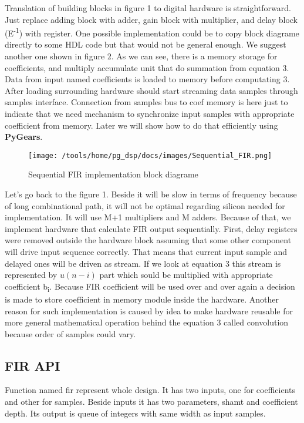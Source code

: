 \documentclass[a4paper, 12pt]{article}
\begin{document}
Translation of building blocks in figure 1 to digital hardware is straightforward. Just replace adding block with adder, gain block with multiplier, and delay block (E\textsuperscript{-1}) with register. One possible implementation could be to copy block diagrame directly to some HDL code but that would not be general enough. We suggest another one shown in figure 2. As we can see, there is a memory storage for coefficients, and multiply accumulate unit that do summation from equation 3. Data from input named coefficients is loaded to memory before computating 3. After loading surrounding hardware should start streaming data samples through samples interface. Connection from samples bus to coef memory is here just to indicate that we need mechanism to synchronize input samples with appropriate coefficient from memory. Later we will show how to do that efficiently using \textbf{PyGears}.

\begin{figure}[h]
\texttt{[image: /tools/home/pg\_dsp/docs/images/Sequential\_FIR.png]}
\caption{Sequential FIR implementation block diagrame}
\label{fig:Sequential FIR calculation}
\end{figure}


Let's go back to the figure 1. Beside it will be slow in terms of frequency because of long combinational path, it will not be optimal regarding silicon needed for implementation. It will use M+1 multipliers and M adders. Because of that, we implement hardware that calculate FIR output sequentially. First, delay registers were removed outside the hardware block assuming that some other component will drive input sequence correctly. That means that current input sample and delayed ones will be driven as stream. If we look at equation 3 this stream is represented by $u(n-i)$ part which sould be multiplied with appropriate coefficient b\textsubscript{i}. Because FIR coefficient will be used over and over again a decision is made to store coefficient in memory module inside the hardware. Another reason for such implementation is caused by idea to make hardware reusable for more general mathematical operation behind the equation 3 called convolution because order of samples could vary.

\subsection{FIR API}


Function named fir represent whole design. It has two inputs, one for coefficients and other for samples. Beside inputs it has two parameters, shamt and coefficient depth. Its output is queue of integers with same width as input samples.
\end{document}
